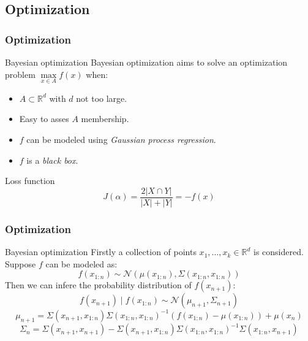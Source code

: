 \subsection{Optimization}
\begin{frame}
    \frametitle{Optimization}
     {
        \begin{block}{Bayesian optimization}
            Bayesian optimization aims to solve an optimization problem $\max\limits_{x\in A}f\left(x\right)$ when:
            \begin{itemize}
                \item $A \subset \mathbb{R}^d$ with $d$ not too large.
                \item Easy to asses $A$ membership.
                \item $f$ can be modeled using \emph{Gaussian process regression}.
                \item $f$ is a \emph{black box}.
            \end{itemize}
        \end{block}
    }
     {
        \begin{exampleblock}{Loss function}
            \begin{equation}
                J\left(\alpha\right) = \frac{2\lvert X \cap Y \rvert}{\lvert X \rvert + \lvert Y \rvert} = -f(x)
            \end{equation}
        \end{exampleblock}
    }
\end{frame}

\begin{frame}
    \frametitle{Optimization}
    \vskip -0.5cm
    \begin{block}{Bayesian optimization}
        Firstly a collection of points $x_1, \ldots, x_k \in \mathbb{R}^d$ is considered. Suppose $f$ can be modeled as:
        \begin{equation*}
            f\left(x_{1:n}\right) \sim \mathcal{N}\left(\mu\left(x_{1:n}\right), \Sigma\left(x_{1:n}, x_{1:n}\right)\right)
        \end{equation*}
        Then we can infere the probability distribution of $f\left(x_{n+1}\right)$:
        \begin{equation}
            f\left(x_{n+1}\right) \mid f\left(x_{1:n}\right) \sim \mathcal{N}\left(\mu_{n+1}, \Sigma_{n+1}\right)
        \end{equation}
        \begin{equation*}
            \mu_{n+1} = \Sigma\left(x_{n+1}, x_{1:n}\right)\Sigma\left(x_{1:n}, x_{1:n}\right)^{-1}\left(f\left(x_{1:n}\right) - \mu\left(x_{1:n}\right)\right) + \mu\left(x_{n}\right)
        \end{equation*}
        \begin{equation*}
            \Sigma_n = \Sigma\left(x_{n+1}, x_{n+1}\right) - \Sigma\left(x_{n+1}, x_{1:n}\right)\Sigma\left(x_{1:n}, x_{1:n}\right)^{-1}\Sigma\left(x_{1:n}, x_{n+1}\right)
        \end{equation*}
    \end{block}
\end{frame}

